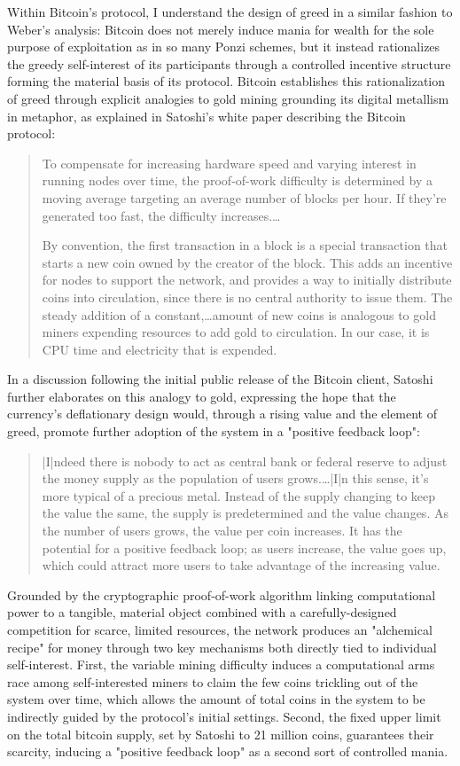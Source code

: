 Within Bitcoin's protocol, I understand the design of greed in a similar fashion to Weber's analysis: Bitcoin does not merely induce mania for wealth for the sole purpose of exploitation as in so many Ponzi schemes, but it instead rationalizes the greedy self-interest of its participants through a controlled incentive structure forming the material basis of its protocol. Bitcoin establishes this rationalization of greed through explicit analogies to gold mining grounding its digital metallism in metaphor, as explained in Satoshi's white paper describing the Bitcoin protocol:

\blockquote{
  To compensate for increasing hardware speed and varying interest in running nodes over time, the proof-of-work difficulty is determined by a moving average targeting an average number of blocks per hour. If they're generated too fast, the difficulty increases.…

  By convention, the first transaction in a block is a special transaction that starts a new coin owned by the creator of the block. This adds an incentive for nodes to support the network, and provides a way to initially distribute coins into circulation, since there is no central authority to issue them. The steady addition of a constant,…amount of new coins is analogous to gold miners expending resources to add gold to circulation. In our case, it is CPU time and electricity that is expended. \autocite*[3--4]{Nakamoto2008}
}
In a discussion following the initial public release of the Bitcoin client, Satoshi further elaborates on this analogy to gold, expressing the hope that the currency's deflationary design would, through a rising value and the element of greed, promote further adoption of the system in a "positive feedback loop":
\blockquote{|I|ndeed there is nobody to act as central bank or federal reserve to adjust the money supply as the population of users grows.…|I|n this sense, it's more typical of a precious metal. Instead of the supply changing to keep the value the same, the supply is predetermined and the value changes. As the number of users grows, the value per coin increases. It has the potential for a positive feedback loop; as users increase, the value goes up, which could attract more users to take advantage of the increasing value. \autocite*{NakamotoP2P}
}

Grounded by the cryptographic proof-of-work algorithm linking computational power to a tangible, material object combined with a carefully-designed competition for scarce, limited resources, the network produces an "alchemical recipe" for money through two key mechanisms both directly tied to individual self-interest. First, the variable mining difficulty induces a computational arms race among self-interested miners to claim the few coins trickling out of the system over time, which allows the amount of total coins in the system to be indirectly guided by the protocol's initial settings. Second, the fixed upper limit on the total bitcoin supply, set by Satoshi to 21 million coins, guarantees their scarcity, inducing a "positive feedback loop" as a second sort of controlled mania.

